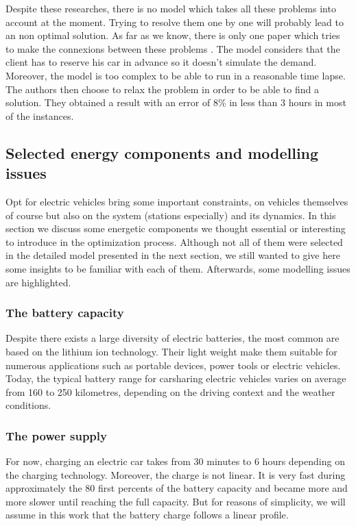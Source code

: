 \begin{bibunit}[ieeetr]
Despite these researches, there is no model which takes all these problems into account at the moment.
Trying to resolve them one by one will probably lead to an non optimal solution.
As far as we know, there is only one paper which tries to make the connexions between these problems \cite{boyaci_optimization_2015}.
The model considers that the client has to reserve his car in advance so it doesn't simulate the demand.
Moreover, the model is too complex to be able to run in a reasonable time lapse.
The authors then choose to relax the problem in order to be able to find a solution.
They obtained a result with an error of 8\% in less than 3 hours in most of the instances.

\subsection{Selected energy components and modelling issues}
Opt for electric vehicles bring some important constraints, on vehicles themselves of course but also on the system (stations especially) and its dynamics.
In this section we discuss some energetic components we thought essential or interesting to introduce in the optimization process.
Although not all of them were selected in the detailed model presented in the next section, we still wanted to give here some insights to be familiar with each of them.
Afterwards, some modelling issues are highlighted.

\subsubsection{The battery capacity}
Despite there exists a large diversity of electric batteries, the most common are based on the lithium ion technology.
Their light weight make them suitable for numerous applications such as portable devices, power tools or electric vehicles.
Today, the typical battery range for carsharing electric vehicles varies on average from 160 to 250 kilometres, depending on the driving context and the weather conditions.

\subsubsection{The power supply}
For now, charging an electric car takes from 30 minutes to 6 hours depending on the charging technology.
Moreover, the charge is not linear.
It is very fast during approximately the 80 first percents of the battery capacity and became more and more slower until reaching the full capacity.
But for reasons of simplicity, we will assume in this work that the battery charge follows a linear profile.


\end{bibunit}
